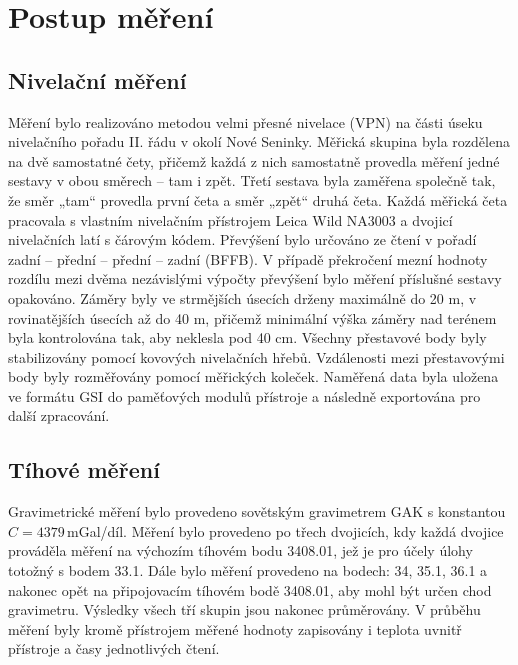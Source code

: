 \section{Postup měření}

\subsection{Nivelační měření}

Měření bylo realizováno metodou velmi přesné nivelace (VPN) na části úseku nivelačního pořadu II. řádu v okolí Nové Seninky. Měřická skupina byla rozdělena na dvě samostatné čety, přičemž každá z nich samostatně provedla měření jedné sestavy v obou směrech – tam i zpět. Třetí sestava byla zaměřena společně tak, že směr „tam“ provedla první četa a směr „zpět“ druhá četa. Každá měřická četa pracovala s vlastním nivelačním přístrojem Leica Wild NA3003 a dvojicí nivelačních latí s čárovým kódem. Převýšení bylo určováno ze čtení v pořadí zadní – přední – přední – zadní (BFFB). V případě překročení mezní hodnoty rozdílu mezi dvěma nezávislými výpočty převýšení bylo měření příslušné sestavy opakováno. Záměry byly ve strmějších úsecích drženy maximálně do 20 m, v rovinatějších úsecích až do 40 m, přičemž minimální výška záměry nad terénem byla kontrolována tak, aby neklesla pod 40 cm. Všechny přestavové body byly stabilizovány pomocí kovových nivelačních hřebů. Vzdálenosti mezi přestavovými body byly rozměřovány pomocí měřických koleček. Naměřená data byla uložena ve formátu GSI do paměťových modulů přístroje a následně exportována pro další zpracování.

\subsection{Tíhové měření}

Gravimetrické měření bylo provedeno sovětským gravimetrem GAK s konstantou $C = 4379\,$mGal/díl. Měření bylo provedeno po třech dvojicích, kdy každá dvojice prováděla měření na výchozím tíhovém bodu 3408.01, jež je pro účely úlohy totožný s bodem 33.1. Dále bylo měření provedeno na bodech: 34, 35.1, 36.1 a nakonec opět na připojovacím tíhovém bodě 3408.01, aby mohl být určen chod gravimetru. Výsledky všech tří skupin jsou nakonec průměrovány. V průběhu měření byly kromě přístrojem měřené hodnoty zapisovány i teplota uvnitř přístroje a časy jednotlivých čtení. 